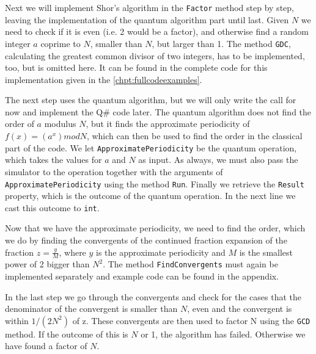 

Next we will implement Shor's algorithm in the \texttt{Factor} method step by step, leaving the implementation of the quantum algorithm part until last. Given $N$ we need to check if it is even (i.e. 2 would be a factor), and otherwise find a random integer $a$ coprime to $N$, smaller than $N$, but larger than 1. The method \texttt{GDC}, calculating the greatest common divisor of two integers, has to be implemented, too, but is omitted here. It can be found in the complete code for this implementation given in the  \autoref{chpt:fullcodeexamples}.



The next step uses the quantum algorithm, but we will only write the call for now and implement the Q\# code later. The quantum algorithm does not find the order of $a$ modulus $N$, but it finds the approximate periodicity of $f(x) = (a^x)mod N$, which can then be used to find the order in the classical part of the code. We let \texttt{ApproximatePeriodicity} be the quantum operation, which takes the values for $a$ and $N$ as input. As always, we must also pass the simulator to the operation together with the arguments of \texttt{ApproximatePeriodicity} using the method \texttt{Run}. Finally we retrieve the \texttt{Result} property, which is the outcome of the quantum operation. In the next line we cast this outcome to \texttt{int}.



Now that we have the approximate periodicity, we need to find the order, which we do by finding the convergents of the continued fraction expansion of the fraction $z = \frac{y}{M}$, where $y$ is the approximate periodicity and $M$ is the smallest power of 2 bigger than $N^2$. The method \texttt{FindConvergents} must again be implemented separately and example code can be found in the appendix.



In the last step we go through the convergents and check for the cases that the denominator of the convergent is smaller than $N$, even and the convergent is within $1/(2N^2)$ of z. These convergents are then used to factor N using the \texttt{GCD} method. If the outcome of this is $N$ or 1, the algorithm has failed. Otherwise we have found a factor of $N$.

